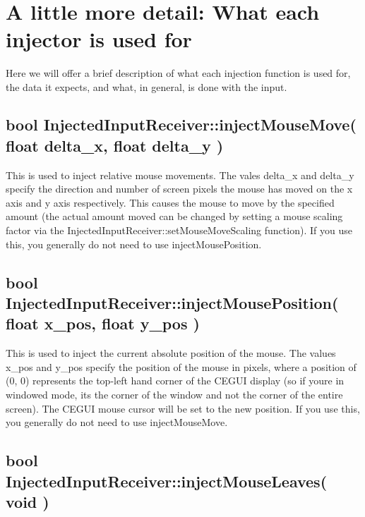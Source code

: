 ~\newline
 \hypertarget{input_tutorial_input_tutorial_detail}{}\section{A little more detail\+: What each injector is used for}\label{input_tutorial_input_tutorial_detail}
Here we will offer a brief description of what each injection function is used for, the data it expects, and what, in general, is done with the input.\hypertarget{input_tutorial_input_tutorial_mousemove}{}\subsection{bool Injected\+Input\+Receiver\+::inject\+Mouse\+Move( float delta\+\_\+x, float delta\+\_\+y )}\label{input_tutorial_input_tutorial_mousemove}
This is used to inject relative mouse movements. The vales {\ttfamily delta\+\_\+x} and {\ttfamily delta\+\_\+y} specify the direction and number of screen pixels the mouse has moved on the x axis and y axis respectively. This causes the mouse to move by the specified amount (the actual amount moved can be changed by setting a mouse scaling factor via the Injected\+Input\+Receiver\+::set\+Mouse\+Move\+Scaling function). If you use this, you generally do not need to use inject\+Mouse\+Position.\hypertarget{input_tutorial_input_tutorial_mousepos}{}\subsection{bool Injected\+Input\+Receiver\+::inject\+Mouse\+Position( float x\+\_\+pos, float y\+\_\+pos )}\label{input_tutorial_input_tutorial_mousepos}
This is used to inject the current absolute position of the mouse. The values {\ttfamily x\+\_\+pos} and {\ttfamily y\+\_\+pos} specify the position of the mouse in pixels, where a position of (0, 0) represents the top-\/left hand corner of the C\+E\+G\+UI display (so if you\textquotesingle{}re in windowed mode, it\textquotesingle{}s the corner of the window and not the corner of the entire screen). The C\+E\+G\+UI mouse cursor will be set to the new position. If you use this, you generally do not need to use inject\+Mouse\+Move.\hypertarget{input_tutorial_input_tutorial_mouseleaves}{}\subsection{bool Injected\+Input\+Receiver\+::inject\+Mouse\+Leaves( void )}\label{input_tutorial_input_tutorial_mouseleaves}
